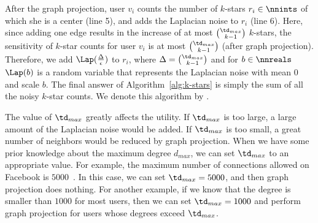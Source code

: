 After the graph projection, 
user $v_i$ 
counts the number of $k$-stars $r_i \in \nnints$ of which she is a center (line 5), and 
adds the Laplacian noise 
to 
$r_i$ 
(line 6). 
Here, since adding one edge results in the increase of at most $\binom{\td_{max}}{k-1}$ $k$-stars, the 
sensitivity of 
$k$-star counts for user $v_i$ 
is at most $\binom{\td_{max}}{k-1}$ (after graph projection). 
Therefore, we add $\Lap(\frac{\Delta}{\epsilon})$ to $r_i$, where $\Delta = \binom{\td_{max}}{k-1}$ and 
for $b \in \nnreals$ 
$\Lap(b)$ is a random variable that represents the Laplacian noise with mean $0$ and scale $b$. 
The final answer of Algorithm~\ref{alg:k-stars} is
simply the sum of all the noisy $k$-star counts. 
We denote this algorithm by .

The value of $\td_{max}$ greatly affects the utility. 
If $\td_{max}$ is too large, a large amount of the Laplacian noise would be added. 
If $\td_{max}$ is too small, a great number of neighbors would be reduced by 
graph projection. 
When we have some prior knowledge about the maximum degree $d_{max}$, we can set $\td_{max}$ to an appropriate value. 
For example, 
the maximum number of connections allowed on Facebook is $5000$~\cite{Facebook_Limit}. 
In this case, we can set $\td_{max}=5000$, and then graph projection does nothing. 
For another example, 
if we know that the degree is smaller than $1000$ for most users, then we can set $\td_{max} = 1000$ and perform graph projection for 
users whose degrees exceed $\td_{max}$. 

